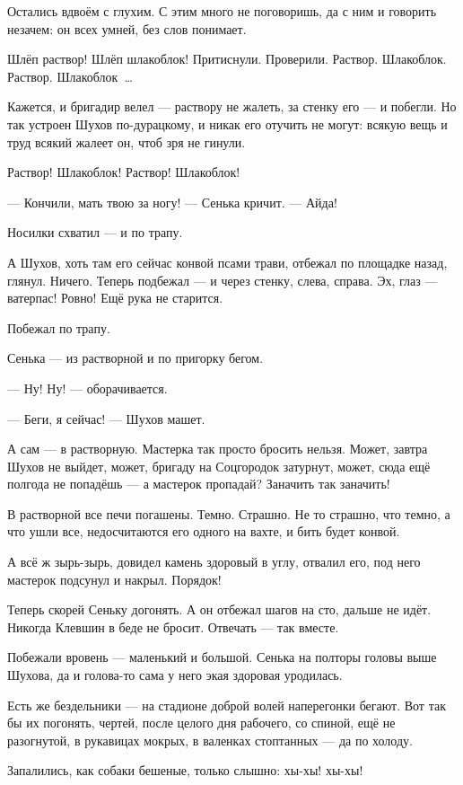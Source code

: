 Остались вдвоём с глухим. С этим много не поговоришь, да с ним и говорить незачем: он всех умней, без слов понимает.

Шлёп раствор! Шлёп шлакоблок! Притиснули. Проверили. Раствор. Шлакоблок. Раствор. Шлакоблок~\dots{}

Кажется, и бригадир велел --- раствору не жалеть, за стенку его --- и побегли. Но так устроен Шухов по-дурацкому, и никак его отучить не могут: всякую вещь и труд всякий жалеет он, чтоб зря не гинули.

Раствор! Шлакоблок! Раствор! Шлакоблок!

--- Кончили, мать твою за ногу! --- Сенька кричит. --- Айда!

Носилки схватил --- и по трапу.

А Шухов, хоть там его сейчас конвой псами трави, отбежал по площадке назад, глянул. Ничего. Теперь подбежал --- и через стенку, слева, справа. Эх, глаз --- ватерпас! Ровно! Ещё рука не старится.

Побежал по трапу.

Сенька --- из растворной и по пригорку бегом.

--- Ну! Ну! --- оборачивается.

--- Беги, я сейчас! --- Шухов машет.

А сам --- в растворную. Мастерка так просто бросить нельзя. Может, завтра Шухов не выйдет, может, бригаду на Соцгородок затурнут, может, сюда ещё полгода не попадёшь --- а мастерок пропадай? Заначить так заначить!

В растворной все печи погашены. Темно. Страшно. Не то страшно, что темно, а что ушли все, недосчитаются его одного на вахте, и бить будет конвой.

А всё ж зырь-зырь, довидел камень здоровый в углу, отвалил его, под него мастерок подсунул и накрыл. Порядок!

Теперь скорей Сеньку догонять. А он отбежал шагов на сто, дальше не идёт. Никогда Клевшин в беде не бросит. Отвечать --- так вместе.

Побежали вровень --- маленький и большой. Сенька на полторы головы выше Шухова, да и голова-то сама у него экая здоровая уродилась.

Есть же бездельники --- на стадионе доброй волей наперегонки бегают. Вот так бы их погонять, чертей, после целого дня рабочего, со спиной, ещё не разогнутой, в рукавицах мокрых, в валенках стоптанных --- да по холоду.

Запалились, как собаки бешеные, только слышно: хы-хы! хы-хы!

